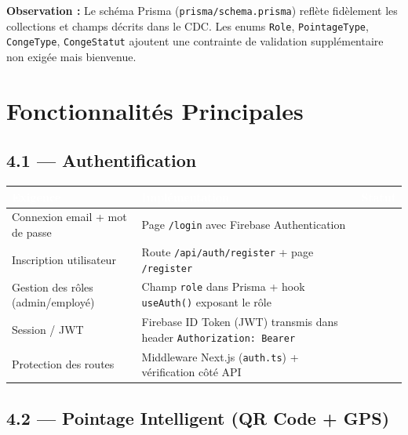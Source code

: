 \documentclass[12pt,a4paper]{article}
\newcommand{\cmark}{\textcolor{vert}{\ding{51}}}
\begin{document}
\textbf{Observation :} Le schéma Prisma (\texttt{prisma/schema.prisma}) reflète fidèlement les collections et champs décrits dans le CDC. Les enums \texttt{Role}, \texttt{PointageType}, \texttt{CongeType}, \texttt{CongeStatut} ajoutent une contrainte de validation supplémentaire non exigée mais bienvenue.

\section{Fonctionnalités Principales}

\subsection{4.1 — Authentification}

\begin{longtable}{p{5.5cm} p{5.5cm} c}
\toprule
\rowcolor{headerblue}
\textcolor{white}{\textbf{Exigence}} & \textcolor{white}{\textbf{Implémentation}} & \textcolor{white}{\textbf{Statut}} \\
\midrule
\endhead
Connexion email + mot de passe & Page \texttt{/login} avec Firebase Authentication & \cmark \\
\midrule
Inscription utilisateur & Route \texttt{/api/auth/register} + page \texttt{/register} & \cmark \\
\midrule
Gestion des rôles (admin/employé) & Champ \texttt{role} dans Prisma + hook \texttt{useAuth()} exposant le rôle & \cmark \\
\midrule
Session / JWT & Firebase ID Token (JWT) transmis dans header \texttt{Authorization: Bearer} & \cmark \\
\midrule
Protection des routes & Middleware Next.js (\texttt{auth.ts}) + vérification côté API & \cmark \\
\bottomrule
\end{longtable}

\subsection{4.2 — Pointage Intelligent (QR Code + GPS)}
\end{document}
